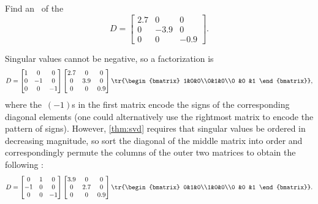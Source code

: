 \begin{example}[positive ordering] 
Find an \svd\ of the 
\begin{equation*}
D=\begin{bmatrix} 2.7&0&0\\0&-3.9&0\\0& 0 &-0.9 \end{bmatrix}.
\end{equation*}
\begin{solution} 
Singular values cannot be negative, so a factorization is
\begin{equation*}
D=\begin{bmatrix} 1&0&0\\0&-1&0\\0 &0 &-1 \end{bmatrix}
\begin{bmatrix} 2.7&0&0\\0&3.9&0\\0 &0 &0.9 \end{bmatrix}
\tr{\begin{bmatrix} 1&0&0\\0&1&0\\0 &0 &1 \end{bmatrix}},
\end{equation*}
where the~\((-1)\)s in the first matrix encode the signs of the corresponding diagonal elements (one could alternatively use the rightmost matrix to encode the pattern of signs).
However, \cref{thm:svd} requires that  singular values be ordered in decreasing magnitude, so sort the diagonal of the middle matrix into order and correspondingly permute the columns of the outer two matrices to obtain the following \svd: 
\begin{equation*}
D=\begin{bmatrix} 0&1&0\\-1&0&0\\0 &0 &-1 \end{bmatrix}
\begin{bmatrix} 3.9&0&0\\0&2.7&0\\0 &0 &0.9 \end{bmatrix}
\tr{\begin{bmatrix} 0&1&0\\1&0&0\\0 &0 &1 \end{bmatrix}}.
\end{equation*} 
\end{solution}
\end{example}



